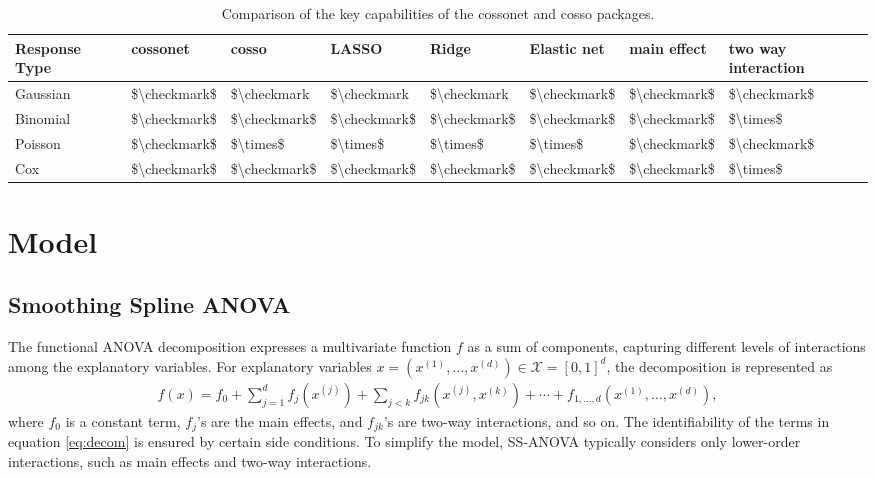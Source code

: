 \begin{table}
\centering
\caption{\label{tab:tab-comp-latex}Comparison of the key capabilities of the cossonet and cosso packages.}
\centering
\begin{tabular}[t]{l|l|l|l|l|l|l|l}
\hline
Response Type & cossonet & cosso & LASSO & Ridge & Elastic net & main effect & two way interaction\\
\hline
Gaussian & \$\textbackslash{}checkmark\$ & \$\textbackslash{}checkmark & \$\textbackslash{}checkmark & \$\textbackslash{}checkmark & \$\textbackslash{}checkmark\$ & \$\textbackslash{}checkmark\$ & \$\textbackslash{}checkmark\$\\
\hline
Binomial & \$\textbackslash{}checkmark\$ & \$\textbackslash{}checkmark\$ & \$\textbackslash{}checkmark\$ & \$\textbackslash{}checkmark\$ & \$\textbackslash{}checkmark\$ & \$\textbackslash{}checkmark\$ & \$\textbackslash{}times\$\\
\hline
Poisson & \$\textbackslash{}checkmark\$ & \$\textbackslash{}times\$ & \$\textbackslash{}times\$ & \$\textbackslash{}times\$ & \$\textbackslash{}times\$ & \$\textbackslash{}checkmark\$ & \$\textbackslash{}checkmark\$\\
\hline
Cox & \$\textbackslash{}checkmark\$ & \$\textbackslash{}checkmark\$ & \$\textbackslash{}checkmark\$ & \$\textbackslash{}checkmark\$ & \$\textbackslash{}checkmark\$ & \$\textbackslash{}checkmark\$ & \$\textbackslash{}times\$\\
\hline
\end{tabular}
\end{table}

\hypertarget{sec2}{%
\section{Model}\label{sec2}}

\hypertarget{ssec2_1}{%
\subsection{Smoothing Spline ANOVA}\label{ssec2_1}}

The functional ANOVA decomposition expresses a multivariate function \(f\) as a sum of components, capturing different levels of interactions among the explanatory variables. For explanatory variables \(x = (x^{(1)}, \dots, x^{(d)}) \in \mathcal{X} = [0, 1]^d\), the decomposition is represented as
\begin{align}
    f(x) = f_0 + \sum_{j=1}^{d} f_j(x^{(j)}) + \sum_{j < k} f_{jk}(x^{(j)}, x^{(k)}) + \cdots + f_{1, \dots, d}(x^{(1)}, \dots, x^{(d)}),
    \label{eq:decom} 
\end{align}
where \(f_0\) is a constant term, \(f_j\)'s are the main effects, and \(f_{jk}\)'s are two-way interactions, and so on. The identifiability of the terms in equation \eqref{eq:decom} is ensured by certain side conditions. To simplify the model, SS-ANOVA typically considers only lower-order interactions, such as main effects and two-way interactions.

